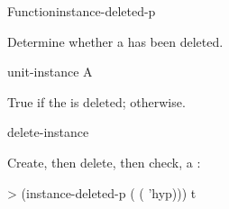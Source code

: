 \documentclass[10pt,twoside,english,pdftex]{article}
\begin{document}
\begin{functiondoc}{Function}{instance-deleted-p}{
    \returns{} }

\fnsyntax

\fnpurpose Determine whether a  has been deleted. 

\fnpackage {}

\fnmodule {}

\fnargs
\begin{args}{unit-instance}
 A 
\end{args}

\fnreturns True if the  is deleted; \nil{} otherwise.

\begin{alsos}{delete-instance}
\end{alsos}

\fnexample
{}%
%
Create, then delete, then check, a  :
%
\W\supp
\begin{example}
> (instance-deleted-p ( ( 'hyp)))
t
\end{example}

\end{functiondoc}

\end{document}
